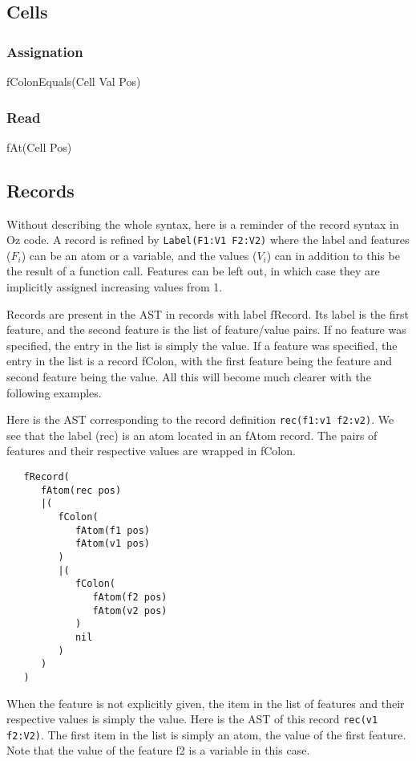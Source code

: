 \documentclass[a4paper]{memoir}
\begin{document}
\subsection{Cells}
\subsubsection{Assignation}
fColonEquals(Cell Val Pos) %
\subsubsection{Read}
fAt(Cell Pos) %
\subsection{Records}\label{sec:input:records}
Without describing the whole syntax, here is a reminder of the record syntax in Oz code. A record is refined by \lstinline!Label(F1:V1 F2:V2)! where the label and features ($F_i$) can be an atom or a variable, and the values ($V_i$) can in addition to this be the result of a function call. Features can be left out, in which case they are implicitly assigned increasing values from 1.

Records are present in the AST in records with label fRecord. Its label is the first feature, and the second feature is the list of feature/value pairs. If no feature was specified, the entry in the list is simply the value. If a feature was specified, the entry in the list is a record fColon, with the first feature being the feature and second feature being the value. All this will become much clearer with the following examples.

Here is the AST corresponding to the record definition \lstinline!rec(f1:v1 f2:v2)!. We see that the label (rec) is an atom located in an fAtom record. The pairs of features and their respective values are wrapped in fColon.

\begin{lstlisting}
   fRecord(
      fAtom(rec pos)
      |(
         fColon(
            fAtom(f1 pos)
            fAtom(v1 pos)
         )
         |(
            fColon(
               fAtom(f2 pos)
               fAtom(v2 pos)
            )
            nil
         )
      )
   )
\end{lstlisting}

When the feature is not explicitly given, the item in the list of features and their respective values is simply the value. Here is the AST of this record \lstinline!rec(v1 f2:V2)!. The first item in the list is simply an atom, the value of the first feature. Note that the value of the feature f2 is a variable in this case.
\end{document}

